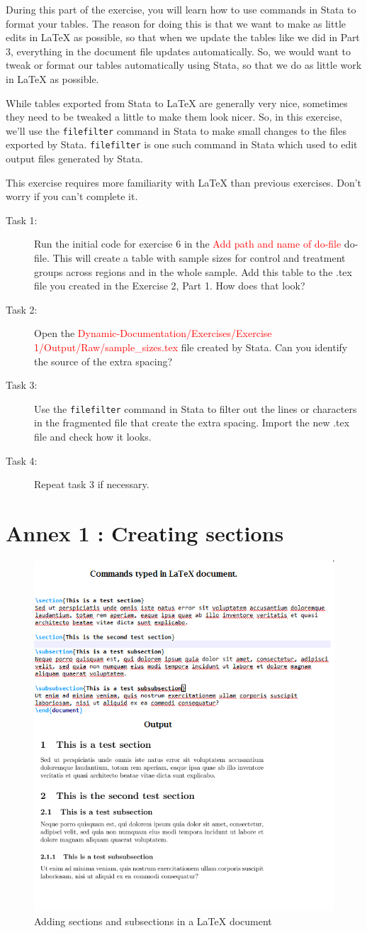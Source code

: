 \documentclass[12pts]{report}
\begin{document}
During this part of the exercise, you will learn how to use commands in Stata to format your tables. The reason for doing this is that we want to make as little edits in {\LaTeX} as possible, so that when we update the tables like we did in Part 3, everything in the document file updates automatically. So, we would want to tweak or format our tables automatically using Stata, so that we do as little work in {\LaTeX} as possible.

While tables exported from Stata to {\LaTeX} are generally very nice, sometimes they need to be tweaked a little to make them look nicer. So, in this exercise, we'll use the \texttt{filefilter} command in Stata to make small changes to the files exported by Stata. \texttt{filefilter} is one such command in Stata which used to edit output files generated by Stata.  

This exercise requires more familiarity with {\LaTeX} than previous exercises. Don't worry if you can't complete it. 

\begin{description}
	\item[Task 1:] Run the initial code for exercise 6 in the \textcolor{red}{Add path and name of do-file} do-file. This will create a table with sample sizes for control and treatment groups across regions and in the whole sample. Add this table to the .tex file you created in the Exercise 2, Part 1. How does that look?
	\item[Task 2:] Open the \textcolor{red}{Dynamic-Documentation/Exercises/Exercise 1/Output/Raw/sample\_sizes.tex} file created by Stata. Can you identify the source of the extra spacing?
	\item[Task 3:] Use the \texttt{filefilter} command in Stata to filter out the lines or characters in the fragmented file that create the extra spacing. Import the new .tex file and check how it looks.
	\item[Task 4:] Repeat task 3 if necessary.
\end{description}


\newpage
\section*{Annex 1 : Creating sections}
\label{sec:Annex}
\begin{figure}[H]
	\centering
	\includegraphics[width=0.7\linewidth]{../img/section}
	\caption{Adding sections and subsections in a {\LaTeX} document}
	\label{fig:adding sections}
\end{figure}
\end{document}
